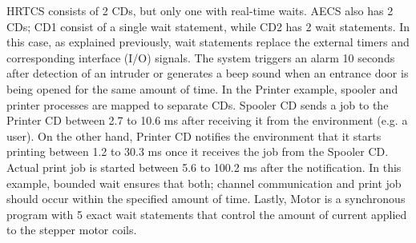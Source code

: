 
HRTCS consists of 2 CDs, but only one with real-time waits. AECS also
has 2 CDs; CD1 consist of a single wait statement, while CD2 has 2 wait
statements. In this case, as explained previously, wait statements
replace the external timers and corresponding interface (I/O)
signals. The system triggers an alarm 10 seconds after detection of an
intruder or generates a beep sound when an entrance door is being opened
for the same amount of time. In the Printer example, spooler and printer
processes are mapped to separate CDs. Spooler CD sends a job to the
Printer CD between 2.7 to 10.6 ms after receiving it from the
environment (e.g. a user). On the other hand, Printer CD notifies the
environment that it starts printing between 1.2 to 30.3 ms once it
receives the job from the Spooler CD. Actual print job is started
between 5.6 to 100.2 ms after the notification. In this example, bounded
wait ensures that both; channel communication and print job should occur
within the specified amount of time. Lastly, Motor is a synchronous
program with 5 exact wait statements that control the amount of current
applied to the stepper motor coils.





